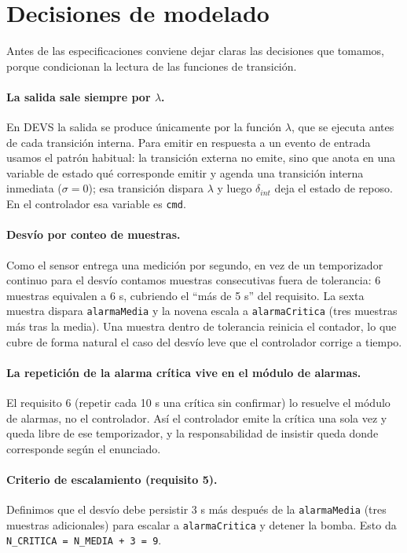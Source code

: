 \documentclass[11pt,a4paper]{article}
\begin{document}
\section{Decisiones de modelado}\label{sec:decisiones}

Antes de las especificaciones conviene dejar claras las decisiones que tomamos, porque condicionan la lectura de las funciones de transición.

\paragraph{La salida sale siempre por $\lambda$.} En DEVS la salida se produce únicamente por la función $\lambda$, que se ejecuta antes de cada transición interna. Para emitir en respuesta a un evento de entrada usamos el patrón habitual: la transición externa no emite, sino que anota en una variable de estado qué corresponde emitir y agenda una transición interna inmediata ($\sigma = 0$); esa transición dispara $\lambda$ y luego $\delta_{int}$ deja el estado de reposo. En el controlador esa variable es \texttt{cmd}.

\paragraph{Desvío por conteo de muestras.} Como el sensor entrega una medición por segundo, en vez de un temporizador continuo para el desvío contamos muestras consecutivas fuera de tolerancia: 6 muestras equivalen a 6 s, cubriendo el ``más de 5 s'' del requisito. La sexta muestra dispara \texttt{alarmaMedia} y la novena escala a \texttt{alarmaCritica} (tres muestras más tras la media). Una muestra dentro de tolerancia reinicia el contador, lo que cubre de forma natural el caso del desvío leve que el controlador corrige a tiempo.

\paragraph{La repetición de la alarma crítica vive en el módulo de alarmas.} El requisito 6 (repetir cada 10 s una crítica sin confirmar) lo resuelve el módulo de alarmas, no el controlador. Así el controlador emite la crítica una sola vez y queda libre de ese temporizador, y la responsabilidad de insistir queda donde corresponde según el enunciado.

\paragraph{Criterio de escalamiento (requisito 5).} Definimos que el desvío debe persistir 3 s más después de la \texttt{alarmaMedia} (tres muestras adicionales) para escalar a \texttt{alarmaCritica} y detener la bomba. Esto da \texttt{N\_CRITICA = N\_MEDIA + 3 = 9}.
\end{document}
